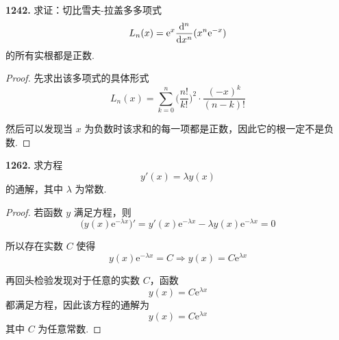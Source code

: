 \textbf{1242.} 求证：切比雪夫-拉盖多多项式
\[L_n(x) = \mathrm{e}^x \frac{\mathop{}\!\mathrm{d}^n}{\mathop{}\!\mathrm{d} x^n}(x^n \mathrm{e}^{-x})\]
的所有实根都是正数.

\begin{proof}
    先求出该多项式的具体形式
    \[L_n(x) = \sum_{k=0}^{n} \biggl(\frac{n!}{k!}\biggr)^2 \cdot \frac{(-x)^k}{(n-k)!}\]

    然后可以发现当 $x$ 为负数时该求和的每一项都是正数，因此它的根一定不是负数.
\end{proof}

\textbf{1262.} 求方程
\[y'(x) = \lambda y(x)\]
的通解，其中 $\lambda$ 为常数.

\begin{proof}
    若函数 $y$ 满足方程，则
    \[\bigl(y(x) \mathrm{e}^{-\lambda x}\bigr)' = y'(x) \mathrm{e}^{-\lambda x} - \lambda y(x) \mathrm{e}^{-\lambda x} = 0\]

    所以存在实数 $C$ 使得
    \[y(x) \mathrm{e}^{-\lambda x} = C \Rightarrow y(x) = C \mathrm{e}^{\lambda x}\]

    再回头检验发现对于任意的实数 $C$，函数
    \[y(x) = C \mathrm{e}^{\lambda x}\]
    都满足方程，因此该方程的通解为
    \[y(x) = C \mathrm{e}^{\lambda x}\]
    其中 $C$ 为任意常数.
\end{proof}